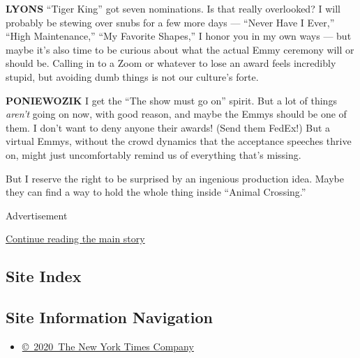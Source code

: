 \textbf{LYONS} ``Tiger King'' got seven nominations. Is that really
overlooked? I will probably be stewing over snubs for a few more days
--- ``Never Have I Ever,'' ``High Maintenance,'' ``My Favorite Shapes,''
I honor you in my own ways --- but maybe it's also time to be curious
about what the actual Emmy ceremony will or should be. Calling in to a
Zoom or whatever to lose an award feels incredibly stupid, but avoiding
dumb things is not our culture's forte.

\textbf{PONIEWOZIK} I get the ``The show must go on'' spirit. But a lot
of things \emph{aren't} going on now, with good reason, and maybe the
Emmys should be one of them. I don't want to deny anyone their awards!
(Send them FedEx!) But a virtual Emmys, without the crowd dynamics that
the acceptance speeches thrive on, might just uncomfortably remind us of
everything that's missing.

But I reserve the right to be surprised by an ingenious production idea.
Maybe they can find a way to hold the whole thing inside ``Animal
Crossing.''

Advertisement

\protect\hyperlink{after-bottom}{Continue reading the main story}

\hypertarget{site-index}{%
\subsection{Site Index}\label{site-index}}

\hypertarget{site-information-navigation}{%
\subsection{Site Information
Navigation}\label{site-information-navigation}}

\begin{itemize}
\tightlist
\item
  \href{https://help.nytimes.com/hc/en-us/articles/115014792127-Copyright-notice}{©~2020~The
  New York Times Company}
\end{itemize}

